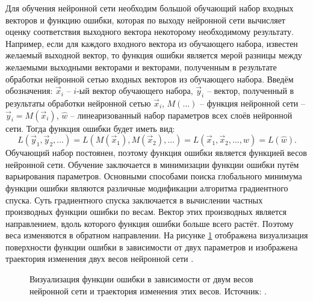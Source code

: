 \par
Для обучения нейронной сети необходим большой обучающий набор входных векторов и функцию ошибки, которая по выходу нейронной сети вычисляет оценку соответствия выходного вектора некоторому необходимому результату. Например, если для каждого входного вектора из обучающего набора, известен желаемый выходной вектор, то функция ошибки является мерой разницы между желаемыми выходными векторами и векторами, полученным в результате обработки нейронной сетью входных векторов из обучающего набора. Введём обозначения: $\vec{x}_i$ -- $i$-ый вектор обучающего набора, $\vec{y}_i$ -- вектор, полученный в результаты обработки нейронной сетью $\vec{x}_i$, $M(\dots)$ -- функция нейронной сети -- $\vec{y}_i=M(\vec{x}_i)$, $\hat{w}$ -- линеаризованный набор параметров всех слоёв нейронной сети. Тогда функция ошибки будет иметь вид:
\begin{equation}\label{eq:loss1}
	L\left(\vec{y}_1,\vec{y}_2,\dots\right) = L\left(M(\vec{x}_1),M(\vec{x}_2),\dots\right) = L(\vec{x}_1,\vec{x}_2,\dots,\hat{w}) = L(\hat{w}).
\end{equation}
Обучающий набор постоянен, поэтому функция ошибки является функцией весов нейронной сети. Обучение заключается в минимизации функции ошибки путём варьирования параметров. Основными способами поиска глобального минимума функции ошибки являются различные модификации алгоритма градиентного спуска. Суть градиентного спуска заключается в вычислении частных производных функции ошибки по весам. Вектор этих производных является направлением, вдоль которого функция ошибки больше всего растёт. Поэтому веса изменяются в обратном направлении. На рисунке \ref{ris:SGD} отображена визуализация поверхности функции ошибки в зависимости от двух параметров и изображена траектория изменения двух весов нейронной сети \cite{amini2018spatial}.
\begin{figure}[htbp]
	\caption{Визуализация функции ошибки в зависимости от двум весов нейронной сети и траектория изменения этих весов. Источник: \cite{amini2018spatial}.}
	\label{ris:SGD}
\end{figure}

